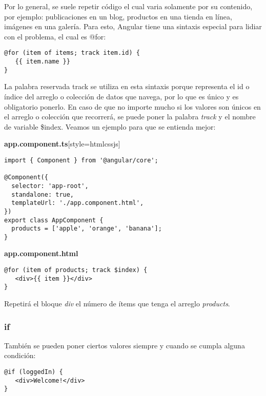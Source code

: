 Por lo general, se suele repetir código el cual varia solamente por su contenido, por ejemplo: publicaciones en un blog, productos en una tienda en línea, imágenes en una galería. Para esto, Angular tiene una sintaxis especial para lidiar con el problema, el cual es @for:
\begin{lstlisting}[style=htmlcssjs]
@for (item of items; track item.id) {
   {{ item.name }}
}
\end{lstlisting}

La palabra reservada track se utiliza en esta sintaxis porque representa el id o índice del arreglo o colección de datos que navega, por lo que es único y es obligatorio ponerlo. En caso de que no importe mucho si los valores son únicos en el arreglo o colección que recorrerá, se puede poner la palabra \textit{track} y el nombre de variable \$index. Veamos un ejemplo para que se entienda mejor:

\textbf{app.component.ts}[style=htmlcssjs]
\begin{lstlisting}[style=htmlcssjs]
import { Component } from '@angular/core';

@Component({
  selector: 'app-root',
  standalone: true,
  templateUrl: './app.component.html',
})
export class AppComponent {
  products = ['apple', 'orange', 'banana'];
}
\end{lstlisting}

\textbf{app.component.html}
\begin{lstlisting}[style=htmlcssjs]
@for (item of products; track $index) {
   <div>{{ item }}</div>
}
\end{lstlisting}

Repetirá el bloque \textit{div} el número de ítems que tenga el arreglo \textit{products}.


\subsubsection{if}

También se pueden poner ciertos valores siempre y cuando se cumpla alguna condición:
\begin{lstlisting}[style=htmlcssjs]
@if (loggedIn) {
   <div>Welcome!</div>
}
\end{lstlisting}
